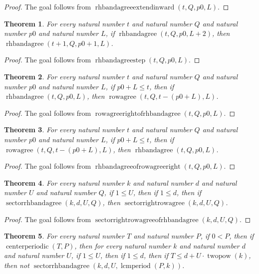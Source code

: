 \documentclass[11pt]{article}
\newtheorem{theorem}{Theorem}[section]
\theoremstyle{definition}
\begin{document}
\begin{proof}
The goal follows from \(\operatorname{rhbandagreeextendinward}(t, Q, p0, L)\).
\end{proof}
\begin{theorem}
\label{ll:paper:rhbandagree-step}
For every natural number \(t\) and natural number \(Q\) and natural number \(p0\) and natural number \(L\), if \(\operatorname{rhbandagree}(t, Q, p0, L + 2)\), then \(\operatorname{rhbandagree}(t + 1, Q, p0 + 1, L)\).
\end{theorem}
\begin{proof}
The goal follows from \(\operatorname{rhbandagreestep}(t, Q, p0, L)\).
\end{proof}
\begin{theorem}
\label{ll:paper:rowagree-right-of-rhbandagree}
For every natural number \(t\) and natural number \(Q\) and natural number \(p0\) and natural number \(L\), if \(p0 + L \le t\), then if \(\operatorname{rhbandagree}(t, Q, p0, L)\), then \(\operatorname{rowagree}(t, Q, t - (p0 + L), L)\).
\end{theorem}
\begin{proof}
The goal follows from \(\operatorname{rowagreerightofrhbandagree}(t, Q, p0, L)\).
\end{proof}
\begin{theorem}
\label{ll:paper:rhbandagree-of-rowagree-right}
For every natural number \(t\) and natural number \(Q\) and natural number \(p0\) and natural number \(L\), if \(p0 + L \le t\), then if \(\operatorname{rowagree}(t, Q, t - (p0 + L), L)\), then \(\operatorname{rhbandagree}(t, Q, p0, L)\).
\end{theorem}
\begin{proof}
The goal follows from \(\operatorname{rhbandagreeofrowagreeright}(t, Q, p0, L)\).
\end{proof}
\begin{theorem}
\label{ll:paper:sectorrightrowagree-of-rhbandagree}
For every natural number \(k\) and natural number \(d\) and natural number \(U\) and natural number \(Q\), if \(1 \le U\), then if \(1 \le d\), then if \(\operatorname{sectorrhbandagree}(k, d, U, Q)\), then \(\operatorname{sectorrightrowagree}(k, d, U, Q)\).
\end{theorem}
\begin{proof}
The goal follows from \(\operatorname{sectorrightrowagreeofrhbandagree}(k, d, U, Q)\).
\end{proof}
\begin{theorem}
\label{ll:paper:not-sector-rhbandagree-lcmperiod}
For every natural number \(T\) and natural number \(P\), if \(0 < P\), then if \(\operatorname{centerperiodic}(T, P)\), then for every natural number \(k\) and natural number \(d\) and natural number \(U\), if \(1 \le U\), then if \(1 \le d\), then if \(T \le d + U \cdot \operatorname{twopow}(k)\), then not \(\operatorname{sectorrhbandagree}(k, d, U, \operatorname{lcmperiod}(P, k))\).
\end{theorem}
\end{document}
